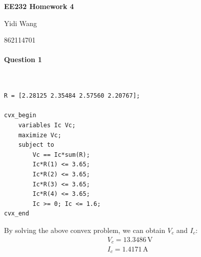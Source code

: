 \documentclass[11pt]{article}
\begin{document}
\centerline{\large \bf EE232 Homework 4}
\centerline{Yidi Wang}
\centerline{862114701}

\vskip 0.1in


\paragraph{Question 1} \mbox{} \\
\begin{lstlisting}
R = [2.28125 2.35484 2.57560 2.20767];

cvx_begin
    variables Ic Vc;
    maximize Vc;
    subject to 
        Vc == Ic*sum(R);
        Ic*R(1) <= 3.65;
        Ic*R(2) <= 3.65;
        Ic*R(3) <= 3.65;
        Ic*R(4) <= 3.65;
        Ic >= 0; Ic <= 1.6;
cvx_end
\end{lstlisting}

\noindent
By solving the above convex problem, we can obtain $V_c$ and $I_c$:
\begin{gather*}
    V_c = 13.3486 \, \mathrm{V} \\
    I_c = 1.4171 \, \mathrm{A}
\end{gather*}

\end{document}
